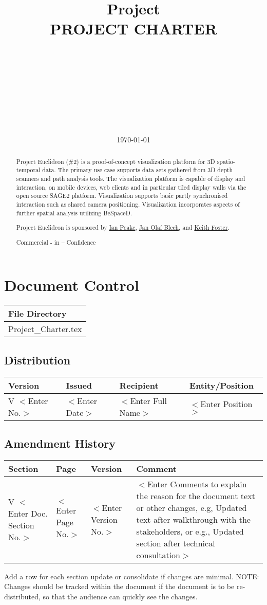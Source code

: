 \documentclass[a4paper]{article}
\title{Project \project\\PROJECT CHARTER}
\author{\Christine\\\ChristineNum\and{}\Kim\\\KimNum\and{}\Robert\\\RobertNum\and{}\Argyll\\\ArgyllNum\and{}\Shyam\\\ShyamNum}
\date{\bigskip\today}
\def\project{Euclideon}
\begin{document}
\maketitle
\begin{abstract}
Project Euclideon (\#2) is a proof-of-concept visualization platform for 3D spatio-temporal data. The primary use case supports data sets gathered from 3D depth scanners and path analysis tools. The visualization platform is capable of display and interaction, on mobile devices, web clients and in particular tiled display walls via the open source SAGE2 platform. Visualization supports basic partly synchronised interaction such as shared camera positioning. Visualization incorporates aspects of further spatial analysis utilizing BeSpaceD.

Project Euclideon is sponsored by \href{mailto:ian.peake@rmit.edu.au?Subject=\project}{Ian Peake}, \href{mailto:janolaf.blech@rmit.edu.au?Subject=\project}{Jan Olaf Blech}, and \href{mailto:keith.foster@rmit.edu.au?Subject=\project}{Keith Foster}.

Commercial - in – Confidence
\end{abstract}

\newpage
\section*{Document Control}
\begin{tabularx}{\textwidth}{|X|}
  \hline\rowcolor{table_header} File Directory\\
  \hline Project\_Charter.tex\\
\hline\end{tabularx}
\subsection*{Distribution}
\begin{tabularx}{\textwidth}{|X|X|X|X|}
  \hline\rowcolor{table_header} Version & Issued & Recipient & Entity/Position\\
  \hline V $<$Enter No.$>$ & $<$Enter Date$>$ & $<$Enter Full Name$>$ & $<$Enter Position$>$\\
\hline\end{tabularx}
\subsection*{Amendment History}
\begin{tabularx}{\textwidth}{|X|X|X|X|}
  \hline\rowcolor{table_header} Section & Page & Version & Comment\\
  \hline V $<$Enter Doc. Section No.$>$ & $<$Enter Page No.$>$ & $<$Enter Version No.$>$ & $<$Enter Comments to explain the reason for the document text or other changes, e.g, Updated text after walkthrough with the stakeholders, or e.g., Updated section after technical consultation$>$\\
\hline\end{tabularx}
Add a row for each section update or consolidate if changes are minimal. NOTE: Changes should be tracked within the document if the document is to be re-distributed, so that the audience can quickly see the changes.
\end{document}
